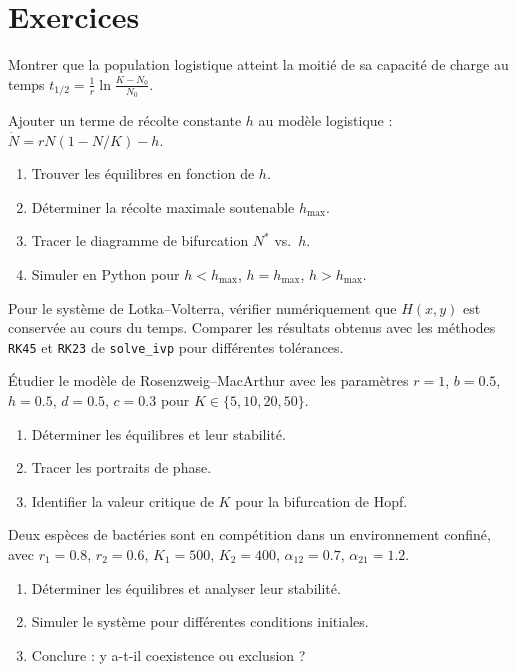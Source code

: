 \section{Exercices}

\begin{exercice}
Montrer que la population logistique atteint la moiti\'e de sa
capacit\'e de charge au temps $t_{1/2} = \frac{1}{r}\ln\frac{K-N_0}{N_0}$.
\end{exercice}

\begin{exercice}
Ajouter un terme de r\'ecolte constante $h$ au mod\`ele logistique :
$\dot{N} = rN(1-N/K) - h$.
\begin{enumerate}
  \item Trouver les \'equilibres en fonction de $h$.
  \item D\'eterminer la r\'ecolte maximale soutenable $h_{\max}$.
  \item Tracer le diagramme de bifurcation $N^*$ vs.\ $h$.
  \item Simuler en Python pour $h < h_{\max}$, $h = h_{\max}$,
    $h > h_{\max}$.
\end{enumerate}
\end{exercice}

\begin{exercice}
Pour le syst\`eme de Lotka--Volterra, v\'erifier num\'eriquement
que $H(x,y)$ est conserv\'ee au cours du temps.  Comparer les
r\'esultats obtenus avec les m\'ethodes \texttt{RK45} et
\texttt{RK23} de \texttt{solve\_ivp} pour diff\'erentes tol\'erances.
\end{exercice}

\begin{exercice}
\'Etudier le mod\`ele de Rosenzweig--MacArthur avec les param\`etres
$r=1$, $b=0.5$, $h=0.5$, $d=0.5$, $c=0.3$ pour $K\in\{5,10,20,50\}$.
\begin{enumerate}
  \item D\'eterminer les \'equilibres et leur stabilit\'e.
  \item Tracer les portraits de phase.
  \item Identifier la valeur critique de $K$ pour la bifurcation de Hopf.
\end{enumerate}
\end{exercice}

\begin{exercice}
Deux esp\`eces de bact\'eries sont en comp\'etition dans un
environnement confin\'e, avec $r_1=0.8$, $r_2=0.6$, $K_1=500$,
$K_2=400$, $\alpha_{12}=0.7$, $\alpha_{21}=1.2$.
\begin{enumerate}
  \item D\'eterminer les \'equilibres et analyser leur stabilit\'e.
  \item Simuler le syst\`eme pour diff\'erentes conditions initiales.
  \item Conclure : y a-t-il coexistence ou exclusion ?
\end{enumerate}
\end{exercice}

